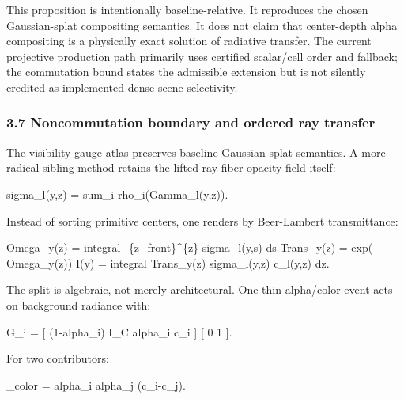 \documentclass[
]{article}
\newenvironment{Shaded}{}{}
\newcommand{\NormalTok}[1]{#1}
\begin{document}
This proposition is intentionally baseline-relative. It reproduces the
chosen Gaussian-splat compositing semantics. It does not claim that
center-depth alpha compositing is a physically exact solution of
radiative transfer. The current projective production path primarily
uses certified scalar/cell order and fallback; the commutation bound
states the admissible extension but is not silently credited as
implemented dense-scene selectivity.

\subsubsection{3.7 Noncommutation boundary and ordered ray
transfer}\label{noncommutation-boundary-and-ordered-ray-transfer}

The visibility gauge atlas preserves baseline Gaussian-splat semantics.
A more radical sibling method retains the lifted ray-fiber opacity field
itself:

\begin{Shaded}
\begin{Highlighting}[]
\NormalTok{sigma\_l(y,z) = sum\_i rho\_i(Gamma\_l(y,z)).}
\end{Highlighting}
\end{Shaded}

Instead of sorting primitive centers, one renders by Beer-Lambert
transmittance:

\begin{Shaded}
\begin{Highlighting}[]
\NormalTok{Omega\_y(z) = integral\_\{z\_front\}\^{}\{z\} sigma\_l(y,s) ds}
\NormalTok{Trans\_y(z) = exp({-}Omega\_y(z))}
\NormalTok{I(y)       = integral Trans\_y(z) sigma\_l(y,z) c\_l(y,z) dz.}
\end{Highlighting}
\end{Shaded}

The split is algebraic, not merely architectural. One thin alpha/color
event acts on background radiance with:

\begin{Shaded}
\begin{Highlighting}[]
\NormalTok{G\_i =}
\NormalTok{  [ (1{-}alpha\_i) I\_C    alpha\_i c\_i ]}
\NormalTok{  [ 0                  1           ].}
\end{Highlighting}
\end{Shaded}

For two contributors:

\begin{Shaded}
\begin{Highlighting}[]
\NormalTok{[G\_i,G\_j]\_color = alpha\_i alpha\_j (c\_i{-}c\_j).}
\end{Highlighting}
\end{Shaded}
\end{document}
